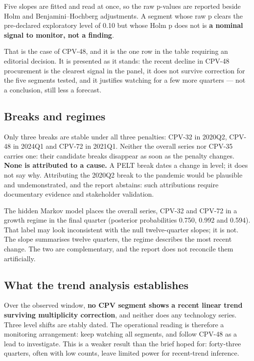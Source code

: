 Five slopes are fitted and read at once, so the raw p-values are reported beside Holm \citep{holm1979} and Benjamini--Hochberg \citep{benjamini1995} adjustments. A segment whose raw p clears the pre-declared exploratory level of 0.10 but whose Holm p does not is \textbf{a nominal signal to monitor, not a finding}.

That is the case of CPV-48, and it is the one row in the table requiring an editorial decision. It is presented as it stands: the recent decline in CPV-48 procurement is the clearest signal in the panel, it does not survive correction for the five segments tested, and it justifies watching for a few more quarters --- not a conclusion, still less a forecast.

\subsection{Breaks and regimes}

Only three breaks are stable under all three penalties: CPV-32 in 2020Q2, CPV-48 in 2024Q1 and CPV-72 in 2021Q1. Neither the overall series nor CPV-35 carries one: their candidate breaks disappear as soon as the penalty changes. \textbf{None is attributed to a cause.} A PELT break dates a change in level; it does not say why. Attributing the 2020Q2 break to the pandemic would be plausible and undemonstrated, and the report abstains: such attributions require documentary evidence and stakeholder validation.

The hidden Markov model places the overall series, CPV-32 and CPV-72 in a growth regime in the final quarter (posterior probabilities 0.750, 0.992 and 0.594). That label may look inconsistent with the null twelve-quarter slopes; it is not. The slope summarises twelve quarters, the regime describes the most recent change. The two are complementary, and the report does not reconcile them artificially.

\subsection{What the trend analysis establishes}

Over the observed window, \textbf{no CPV segment shows a recent linear trend surviving multiplicity correction}, and neither does any technology series. Three level shifts are stably dated. The operational reading is therefore a monitoring arrangement: keep watching all segments, and follow CPV-48 as a lead to investigate. This is a weaker result than the brief hoped for: forty-three quarters, often with low counts, leave limited power for recent-trend inference.
